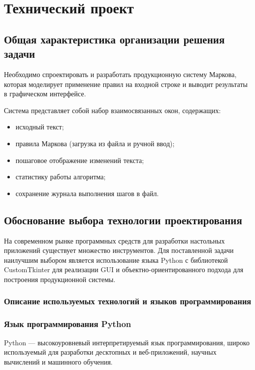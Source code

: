 \section{Технический проект}
\subsection{Общая характеристика организации решения задачи}

Необходимо спроектировать и разработать продукционную систему Маркова, которая моделирует применение правил на входной строке и выводит результаты в графическом интерфейсе.  

Система представляет собой набор взаимосвязанных окон, содержащих:
\begin{itemize}
	\item исходный текст;
	\item правила Маркова (загрузка из файла и ручной ввод);
	\item пошаговое отображение изменений текста;
	\item статистику работы алгоритма;
	\item сохранение журнала выполнения шагов в файл.
\end{itemize}

\subsection{Обоснование выбора технологии проектирования}

На современном рынке программных средств для разработки настольных приложений существует множество инструментов. Для поставленной задачи наилучшим выбором является использование языка Python с библиотекой CustomTkinter для реализации GUI и объектно-ориентированного подхода для построения продукционной системы.

\subsubsection{Описание используемых технологий и языков программирования}

\subsubsection{Язык программирования Python}

Python — высокоуровневый интерпретируемый язык программирования, широко используемый для разработки десктопных и веб-приложений, научных вычислений и машинного обучения.  

